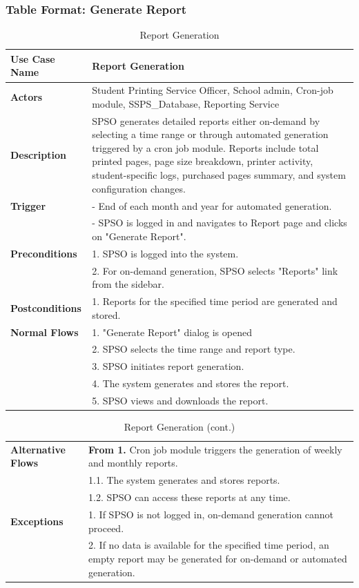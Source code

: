 \subsubsection{Table Format: Generate Report}

\begin{table}[H]
\begin{tabular}{|p{5cm}|p{9cm}|}
\hline
\textbf{Use Case Name} & Report Generation \\
\hline
\textbf{Actors} & Student Printing Service Officer, School admin, Cron-job module, SSPS\_Database, Reporting Service \\
\hline
\textbf{Description} & SPSO generates detailed reports either on-demand by selecting a time range or through automated generation triggered by a cron job module. Reports include total printed pages, page size breakdown, printer activity, student-specific logs, purchased pages summary, and system configuration changes. \\
\hline
\textbf{Trigger} & - End of each month and year for automated generation. \\
& - SPSO is logged in and navigates to Report page and clicks on "Generate Report". \\
\hline
\textbf{Preconditions} & 1. SPSO is logged into the system. \\
& 2. For on-demand generation, SPSO selects "Reports" link from the sidebar. \\
\hline
\textbf{Postconditions} & 1. Reports for the specified time period are generated and stored. \\
\hline
\textbf{Normal Flows} & 1. "Generate Report" dialog is opened \\
& 2. SPSO selects the time range and report type. \\
& 3. SPSO initiates report generation. \\
& 4. The system generates and stores the report. \\
& 5. SPSO views and downloads the report. \\
\hline
\end{tabular}
\caption{Report Generation}
\end{table}

\begin{table}[H]
\begin{tabular}{|p{5cm}|p{9cm}|}
\hline
\textbf{Alternative Flows} & \textbf{From 1.} Cron job module triggers the generation of weekly and monthly reports. \\
& 1.1. The system generates and stores reports. \\
& 1.2. SPSO can access these reports at any time. \\
\hline
\textbf{Exceptions} & 1. If SPSO is not logged in, on-demand generation cannot proceed. \\
& 2. If no data is available for the specified time period, an empty report may be generated for on-demand or automated generation. \\
\hline
\end{tabular}
\caption{Report Generation (cont.)}
\end{table}

